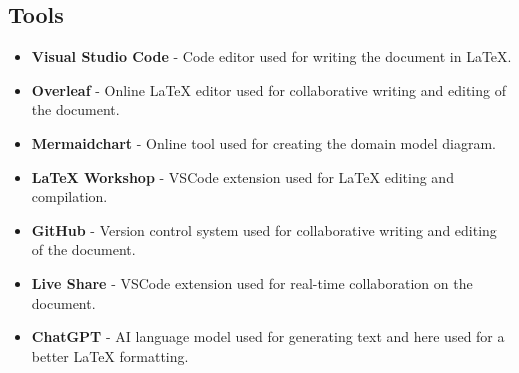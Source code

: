 \documentclass{article}
\begin{document}
\subsection{Tools}
\begin{itemize}
    \item \textbf{Visual Studio Code} - Code editor used for writing the document in LaTeX.
    \item \textbf{Overleaf} - Online LaTeX editor used for collaborative writing and editing of the document.
    \item \textbf{Mermaidchart} - Online tool used for creating the domain model diagram.
    \item \textbf{LaTeX Workshop} - VSCode extension used for LaTeX editing and compilation.
    \item \textbf{GitHub} - Version control system used for collaborative writing and editing of the document.
    \item \textbf{Live Share} - VSCode extension used for real-time collaboration on the document.
    \item \textbf{ChatGPT} - AI language model used for generating text and here used for a better LaTeX formatting.




\end{itemize}
\end{document}
